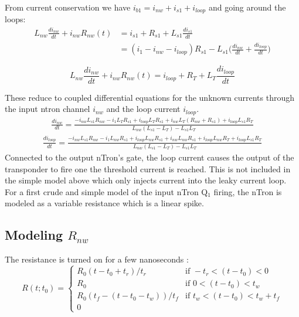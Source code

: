 \documentclass{article}
\begin{document}
From current conservation we have $i_{b1} = i_{nw} + i_{s1} + i_{loop}$  and going around the loops:
\begin{equation} \label{tloop1}
  \begin{split}
    L_{nw} \frac{d i_{nw}}{dt} + i_{nw} R_{nw}(t) &= i_{s1} +R_{s1} + L_{s1} \frac{d i_{s1}}{dt} \\
                                                  &= (i_{1} - i_{nw} - i_{loop} )R_{s1} - L_{s1} \Big(\frac{d i_{nw}}{dt} + \frac{d i_{loop}}{dt}\Big)
  \end{split}
\end{equation}

\begin{equation} \label{tloop2}
    L_{nw} \frac{d i_{nw}}{dt} + i_{nw} R_{nw}(t) = i_{loop} +R_{T} + L_{T} \frac{d i_{loop}}{dt} 
\end{equation}

These reduce to coupled differential equations for the unknown currents through the input ntron channel $i_{nw}$ and the loop current $i_{loop}$. 
\begin{multline}
  \frac{di_{nw}}{dt} =  \frac{-i_{nw} L_{s1} R_{nw} - i_{1} L_T R_{s1} + i_{loop} L_T R_{s1} + i_{nw} L_{T} (R_{nw} + R_{s1}) + i_{loop} L_{s1} R_T}{L_{nw} (L_{s1} - L_T) - L_{s1} L_T}
\end{multline}
\begin{multline}
  \frac{di_{loop}}{dt} =  \frac{-i_{nw} L_{s1} R_{nw} - i_{1} L_{nw} R_{s1} + i_{loop} L_{nw} R_{s1} + i_{nw} L_{nw} R_{s1} + i_{loop} L_{nw} R_T + i_{loop} L_{s1} R_T}{L_{nw} (L_{s1} - L_T) - L_{s1} L_T}
\end{multline}
Connected to the output nTron's gate, the loop current causes the output of the transponder to fire one the threshold current is reached.
This is not included in the simple model above which only injects current into the leaky current loop.
For a first crude and simple model of the input nTron  Q$_1$ firing, the nTron is modeled as a variable resistance which is a linear spike.

\subsection{Modeling $R_{nw}$}
The resistance is turned on for a few nanoseconds :
\begin{equation}
R(t; t_0) = 
    \begin{cases}
        R_0 (t-t_0+t_r)/t_r & \text{if } -t_r < (t-t_0) <0 \\
        R_0 & \text{if } 0 <  (t-t_0) < t_w \\
        R_0 (t_f-(t-t_0 -t_w))/t_f & \text{if } t_w < (t-t_0) < t_w + t_f  \\
        0 
    \end{cases}
\end{equation}
\end{document}
